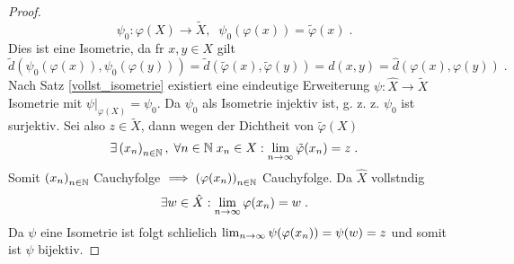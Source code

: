 \begin{proof}
	\[\psi_0: \varphi(X) \to \tilde X, \;\; \psi_0(\varphi(x)) = \tilde\varphi(x)\;.\]
	Dies ist eine Isometrie, da f\us r $x,y \in X$ gilt 
	\[\tilde d\left(\psi_0(\varphi(x)), \psi_0(\varphi(y))\right) = \tilde d(\tilde\varphi(x), \tilde\varphi(y)) = d(x,y) = \hat d(\varphi(x), \varphi(y))\;.\]
	Nach Satz \ref{vollst_isometrie} existiert eine eindeutige Erweiterung \(\psi: \hat X \to \tilde X\) Isometrie mit \(\psi\vert_{\varphi(X)} = \psi_0\). Da $\psi_0$ als Isometrie injektiv ist, g. z. z. $\psi_0$ ist surjektiv. Sei also \(z \in \tilde X\), dann wegen der Dichtheit von $\tilde\varphi(X)$
	\[\exists \left (x_n\right )_{n\in \mathbb{N}}, \; \forall n \in \mathbb{N}\; x_n \in X: \lim_{n \to\infty} \tilde\varphi(x_n) = z\;.\]
	Somit  \( \left (x_n\right )_{n\in \mathbb{N}}\) Cauchyfolge \( \implies \left (\varphi(x_n)\right )_{n\in \mathbb{N}} \) Cauchyfolge. Da $\hat X$ vollst\as ndig
	\[\exists w \in \hat X: \lim_{n \to\infty} \varphi(x_n) = w\;.\]
	Da $\psi$ eine Isometrie ist folgt schlie\s lich \(\lim_{n \to\infty} \psi(\varphi(x_n)) = \psi(w) = z\) und somit ist $\psi$ bijektiv.
\end{proof}

